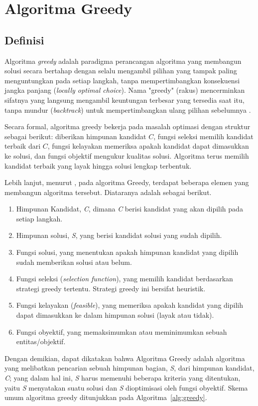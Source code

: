 \section{Algoritma Greedy}

\subsection{Definisi}

Algoritma \textit{greedy} adalah paradigma perancangan algoritma yang membangun solusi secara bertahap dengan selalu mengambil pilihan yang tampak paling menguntungkan pada setiap langkah, tanpa mempertimbangkan konsekuensi jangka panjang (\textit{locally optimal choice}). Nama "greedy" (rakus) mencerminkan sifatnya yang langsung mengambil keuntungan terbesar yang tersedia saat itu, tanpa mundur (\textit{backtrack}) untuk mempertimbangkan ulang pilihan sebelumnya \cite{cormen2009introduction}.

Secara formal, algoritma greedy bekerja pada masalah optimasi dengan struktur sebagai berikut: diberikan himpunan kandidat $C$, fungsi seleksi memilih kandidat terbaik dari $C$, fungsi kelayakan memeriksa apakah kandidat dapat dimasukkan ke solusi, dan fungsi objektif mengukur kualitas solusi. Algoritma terus memilih kandidat terbaik yang layak hingga solusi lengkap terbentuk.

Lebih lanjut, menurut \cite{pptstima}, pada algoritma Greedy, terdapat beberapa elemen yang membangun algoritma tersebut. Diataranya adalah sebagai berikut.
\begin{enumerate}
  \item Himpunan Kandidat, \textit{C}, dimana \textit{C} berisi kandidat yang akan dipilih pada setiap langkah.
  \item Himpunan solusi, \textit{S}, yang berisi kandidat solusi yang sudah dipilih.
  \item Fungsi solusi, yang menentukan apakah himpunan kandidat yang dipilih sudah memberikan solusi atau belum.
  \item Fungsi seleksi (\textit{selection function}), yang memilih kandidat berdasarkan strategi greedy tertentu. Strategi greedy ini bersifat heuristik.
  \item Fungsi kelayakan (\textit{feasible}), yang  memeriksa apakah kandidat yang dipilih dapat dimasukkan ke dalam himpunan solusi (layak atau tidak).
  \item Fungsi obyektif, yang memaksimumkan atau meminimumkan sebuah entitas/objektif.
\end{enumerate}
Dengan demikian, dapat dikatakan bahwa Algoritma Greedy adalah algoritma yang melibatkan pencarian sebuah himpunan bagian, \textit{S}, dari himpunan kandidat, \textit{C}; yang dalam hal ini, \textit{S} harus memenuhi beberapa kriteria yang ditentukan,
yaitu \textit{S} menyatakan suatu solusi dan \textit{S} dioptimisasi oleh fungsi obyektif.
Skema umum algoritma greedy ditunjukkan pada Algoritma~\ref{alg:greedy}.

